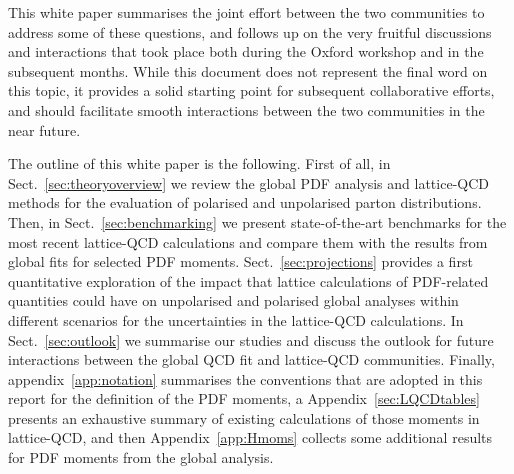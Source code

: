 This white paper summarises the joint
effort between the two communities to address some of these questions, 
and follows up on the very fruitful discussions and interactions that took place both during 
the Oxford workshop and in the subsequent months.
%
While this document does not represent the final word on this topic,
it provides a solid starting point for subsequent collaborative efforts,
and should facilitate smooth 
interactions between the two communities in the near future.

The outline of this white paper is the following.
%
First of all, in Sect.~\ref{sec:theoryoverview} we review
the global PDF analysis and lattice-QCD methods for the evaluation
of polarised and unpolarised parton distributions.
%
Then, in Sect.~\ref{sec:benchmarking}
we present state-of-the-art benchmarks for the most
recent lattice-QCD calculations and compare them with the results from global fits
for selected PDF moments.
%
Sect.~\ref{sec:projections} provides a first quantitative
exploration of the impact that
lattice calculations of PDF-related quantities could have on unpolarised
and polarised global analyses within different scenarios
for the uncertainties in the lattice-QCD calculations.
%
In Sect.~\ref{sec:outlook} we summarise our studies
and discuss the outlook for future interactions between
the global QCD fit and lattice-QCD communities.
%
Finally, appendix~\ref{app:notation} summarises the conventions
that are adopted in this report for the definition of the PDF
moments, a
Appendix~\ref{sec:LQCDtables} presents an exhaustive summary of existing calculations
of those moments in lattice-QCD,
and then Appendix~\ref{app:Hmoms} collects some
additional results for PDF moments from the global analysis.

